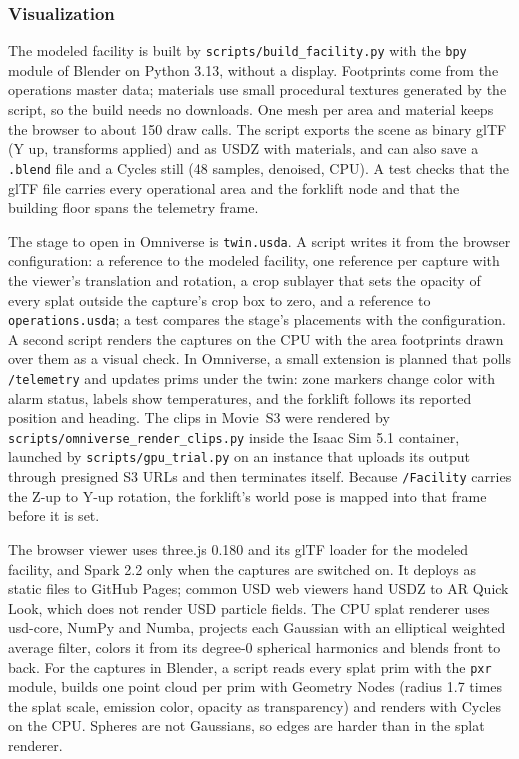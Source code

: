 \documentclass{article}
\newcommand{\code}[1]{\texttt{\small #1}}
\begin{document}
\subsubsection{Visualization}
The modeled facility is built by \code{scripts/build\_facility.py} with the
\code{bpy} module of Blender on Python 3.13, without a display. Footprints
come from the operations master data; materials use small procedural textures
generated by the script, so the build needs no downloads. One mesh per area and
material keeps the browser to about 150 draw calls. The script exports the
scene as binary glTF (Y up, transforms applied) and as USDZ with materials, and
can also save a \code{.blend} file and a Cycles still (48 samples, denoised,
CPU). A test checks that the glTF file carries every operational area and the
forklift node and that the building floor spans the telemetry frame.

The stage to open in Omniverse is \code{twin.usda}. A script writes it from
the browser configuration: a reference to the modeled facility, one reference
per capture with the viewer's translation and rotation, a crop sublayer that
sets the opacity of every splat outside the capture's crop box to zero, and a
reference to \code{operations.usda}; a test compares the stage's placements
with the configuration. A second script renders the captures on the CPU with
the area footprints drawn over them as a visual check. In Omniverse, a small
extension is planned that polls \code{/telemetry} and updates prims under the
twin: zone markers change color with alarm status, labels show temperatures,
and the forklift follows its reported position and heading. The clips in
Movie~S3 were rendered by \code{scripts/omniverse\_render\_clips.py} inside the
Isaac Sim 5.1 container, launched by \code{scripts/gpu\_trial.py} on an
instance that uploads its output through presigned S3 URLs and then
terminates itself. Because \code{/Facility} carries the Z-up to Y-up rotation,
the forklift's world pose is mapped into that frame before it is set.

The browser viewer uses three.js 0.180 and its glTF loader for the modeled
facility, and Spark 2.2 \cite{spark} only when the captures are switched on.
It deploys as static files to GitHub Pages; common USD web viewers hand USDZ
to AR Quick Look, which does not render USD particle fields. The CPU splat
renderer uses usd-core, NumPy and Numba, projects each Gaussian with an
elliptical weighted average filter, colors it from its degree-0 spherical
harmonics and blends front to back. For the captures in Blender, a script
reads every splat prim with the \code{pxr} module, builds one point cloud per
prim with Geometry Nodes (radius 1.7 times the splat scale, emission color,
opacity as transparency) and renders with Cycles on the CPU. Spheres are not
Gaussians, so edges are harder than in the splat renderer.
\end{document}
